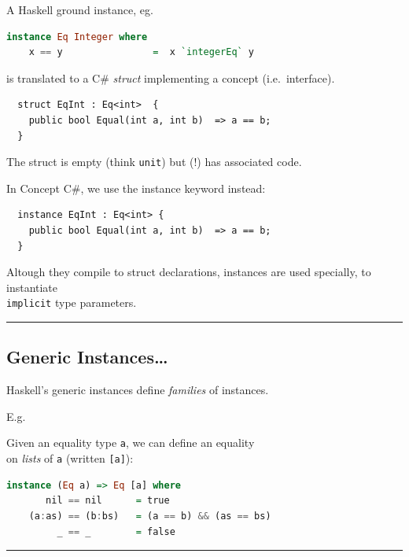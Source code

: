 A Haskell ground instance, eg.

\begin{lstlisting}[language=Haskell]
  instance Eq Integer where 
    x == y                =  x `integerEq` y
\end{lstlisting}

is translated to a C\# \emph{struct} implementing a concept
(i.e.~interface).

\begin{lstlisting}
  struct EqInt : Eq<int>  {
    public bool Equal(int a, int b)  => a == b; 
  }
\end{lstlisting}

The struct is empty (think \lstinline!unit!) but (!) has associated
code.

In Concept C\#, we use the instance keyword instead:

\begin{lstlisting}
  instance EqInt : Eq<int> {
    public bool Equal(int a, int b)  => a == b; 
  }
\end{lstlisting}

Altough they compile to struct declarations, instances are used
specially, to instantiate\\
\lstinline!implicit! type parameters.

\begin{center}\rule{0.5\linewidth}{\linethickness}\end{center}

\subsection{Generic Instances\ldots{}}\label{generic-instances}

Haskell's generic instances define \emph{families} of instances.

E.g.

Given an equality type \lstinline!a!, we can define an equality\\
on \emph{lists} of \lstinline!a! (written \lstinline![a]!):

\begin{lstlisting}[language=Haskell]
  instance (Eq a) => Eq [a] where 
       nil == nil      = true
    (a:as) == (b:bs)   = (a == b) && (as == bs)
         _ == _        = false
\end{lstlisting}

\begin{center}\rule{0.5\linewidth}{\linethickness}\end{center}

